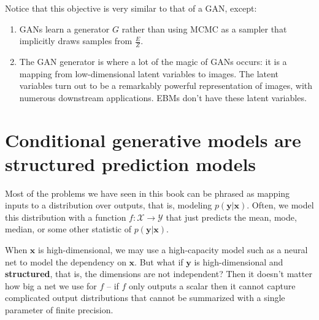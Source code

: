 Notice that this objective is very similar to that of a GAN, except:
\begin{enumerate}
    \item GANs learn a generator $G$ rather than using MCMC as a sampler that implicitly draws samples from $\frac{E}{Z}$.
    \item The GAN generator is where a lot of the magic of GANs occurs: it is a mapping from low-dimensional latent variables to images. The latent variables turn out to be a remarkably powerful representation of images, with numerous downstream applications. EBMs don't have these latent variables.
\end{enumerate}



\section{Conditional generative models are structured prediction models}

Most of the problems we have seen in this book can be phrased as mapping inputs to a distribution over outputs, that is, modeling $p(\mathbf{y} | \mathbf{x})$. Often, we model this distribution with a function $f: \mathcal{X} \rightarrow \mathcal{Y}$ that just predicts the mean, mode, median, or some other statistic of $p(\mathbf{y} | \mathbf{x})$.

When $\mathbf{x}$ is high-dimensional, we may use a high-capacity model such as a neural net to model the dependency on $\mathbf{x}$. But what if $\mathbf{y}$ is high-dimensional and {\bf structured}, that is, the dimensions are not independent? Then it doesn't matter how big a net we use for $f$ -- if $f$ only outputs a scalar then it cannot capture complicated output distributions that cannot be summarized with a single parameter of finite precision.

